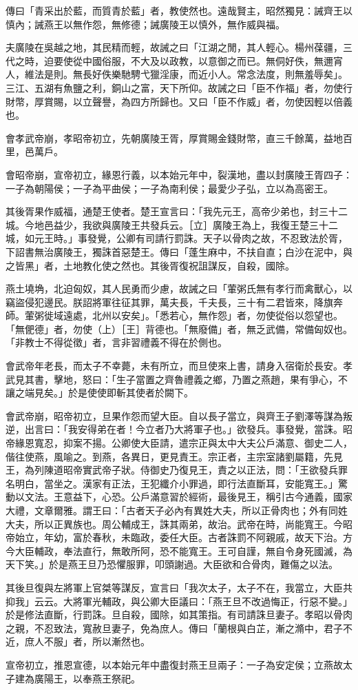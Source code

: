\begin{pinyinscope}
傳曰「青采出於藍，而質青於藍」者，教使然也。遠哉賢主，昭然獨見：誡齊王以慎內；誡燕王以無作怨，無修德；誡廣陵王以慎外，無作威與福。

夫廣陵在吳越之地，其民精而輕，故誡之曰「江湖之閒，其人輕心。楊州葆疆，三代之時，迫要使從中國俗服，不大及以政教，以意御之而已。無侗好佚，無邇宵人，維法是則。無長好佚樂馳騁弋獵淫康，而近小人。常念法度，則無羞辱矣」。三江、五湖有魚鹽之利，銅山之富，天下所仰。故誡之曰「臣不作福」者，勿使行財幣，厚賞賜，以立聲譽，為四方所歸也。又曰「臣不作威」者，勿使因輕以倍義也。

會孝武帝崩，孝昭帝初立，先朝廣陵王胥，厚賞賜金錢財幣，直三千餘萬，益地百里，邑萬戶。

會昭帝崩，宣帝初立，緣恩行義，以本始元年中，裂漢地，盡以封廣陵王胥四子：一子為朝陽侯；一子為平曲侯；一子為南利侯；最愛少子弘，立以為高密王。

其後胥果作威福，通楚王使者。楚王宣言曰：「我先元王，高帝少弟也，封三十二城。今地邑益少，我欲與廣陵王共發兵云。［立］廣陵王為上，我復王楚三十二城，如元王時。」事發覺，公卿有司請行罰誅。天子以骨肉之故，不忍致法於胥，下詔書無治廣陵王，獨誅首惡楚王。傳曰「蓬生麻中，不扶自直；白沙在泥中，與之皆黑」者，土地教化使之然也。其後胥復祝詛謀反，自殺，國除。

燕土墝埆，北迫匈奴，其人民勇而少慮，故誡之曰「葷粥氏無有孝行而禽獸心，以竊盜侵犯邊民。朕詔將軍往征其罪，萬夫長，千夫長，三十有二君皆來，降旗奔師。葷粥徙域遠處，北州以安矣」。「悉若心，無作怨」者，勿使從俗以怨望也。「無俷德」者，勿使（上）［王］背德也。「無廢備」者，無乏武備，常備匈奴也。「非教士不得從徵」者，言非習禮義不得在於側也。

會武帝年老長，而太子不幸薨，未有所立，而旦使來上書，請身入宿衛於長安。孝武見其書，擊地，怒曰：「生子當置之齊魯禮義之鄉，乃置之燕趙，果有爭心，不讓之端見矣。」於是使使即斬其使者於闕下。

會武帝崩，昭帝初立，旦果作怨而望大臣。自以長子當立，與齊王子劉澤等謀為叛逆，出言曰：「我安得弟在者！今立者乃大將軍子也。」欲發兵。事發覺，當誅。昭帝緣恩寬忍，抑案不揚。公卿使大臣請，遣宗正與太中大夫公戶滿意、御史二人，偕往使燕，風喻之。到燕，各異日，更見責王。宗正者，主宗室諸劉屬籍，先見王，為列陳道昭帝實武帝子狀。侍御史乃復見王，責之以正法，問：「王欲發兵罪名明白，當坐之。漢家有正法，王犯纖介小罪過，即行法直斷耳，安能寬王。」驚動以文法。王意益下，心恐。公戶滿意習於經術，最後見王，稱引古今通義，國家大禮，文章爾雅。謂王曰：「古者天子必內有異姓大夫，所以正骨肉也；外有同姓大夫，所以正異族也。周公輔成王，誅其兩弟，故治。武帝在時，尚能寬王。今昭帝始立，年幼，富於春秋，未臨政，委任大臣。古者誅罰不阿親戚，故天下治。方今大臣輔政，奉法直行，無敢所阿，恐不能寬王。王可自謹，無自令身死國滅，為天下笑。」於是燕王旦乃恐懼服罪，叩頭謝過。大臣欲和合骨肉，難傷之以法。

其後旦復與左將軍上官桀等謀反，宣言曰「我次太子，太子不在，我當立，大臣共抑我」云云。大將軍光輔政，與公卿大臣議曰：「燕王旦不改過悔正，行惡不變。」於是修法直斷，行罰誅。旦自殺，國除，如其策指。有司請誅旦妻子。孝昭以骨肉之親，不忍致法，寬赦旦妻子，免為庶人。傳曰「蘭根與白芷，漸之滫中，君子不近，庶人不服」者，所以漸然也。

宣帝初立，推恩宣德，以本始元年中盡復封燕王旦兩子：一子為安定侯；立燕故太子建為廣陽王，以奉燕王祭祀。


\end{pinyinscope}